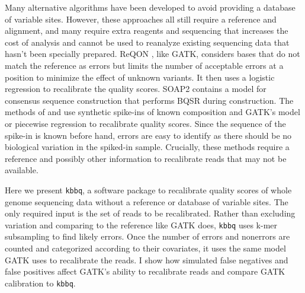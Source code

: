 Many alternative algorithms have been developed to avoid providing a database of variable sites. However, these approaches all still require a reference and alignment, and many require extra reagents and sequencing that increases the cost of analysis and cannot be used to reanalyze existing sequencing data that hasn't been specially prepared.
ReQON \parencite{cabanski_reqon:_2012}, like GATK, considers bases that do not match the reference as errors but limits the number of acceptable errors at a position to minimize the effect of unknown variants. It then uses a logistic regression to recalibrate the quality scores.
SOAP2 \parencite{li_soap2:_2009} contains a model for consensus sequence construction that performs BQSR during construction. %
The methods of \cite{zook_synthetic_2012} and \cite{ni_improvement_2016} use synthetic spike-ins of known composition and GATK's model \cite{zook_synthetic_2012} or piecewise regression \parencite{ni_improvement_2016} to recalibrate quality scores. Since the sequence of the spike-in is known before hand, errors are easy to identify as there should be no biological variation in the spiked-in sample.
Crucially, these methods require a reference and possibly other information to recalibrate reads that may not be available.

Here we present \texttt{kbbq}, a software package to recalibrate quality scores of whole genome sequencing data without a reference or database of variable sites. The only required input is the set of reads to be recalibrated. Rather than excluding variation and comparing to the reference like GATK does, \texttt{kbbq} uses k-mer subsampling to find likely errors. Once the number of errors and nonerrors are counted and categorized according to their covariates, it uses the same model GATK uses to recalibrate the reads. I show how simulated false negatives and false positives affect GATK's ability to recalibrate reads and compare GATK calibration to \texttt{kbbq}.
